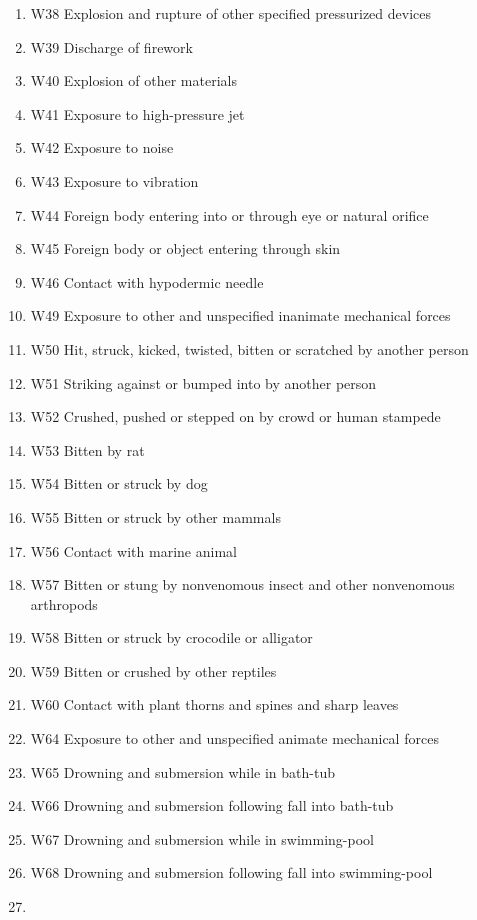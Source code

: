 \documentclass[
]{scrartcl}
\begin{document}
\begin{itemize}
\begin{enumerate}
  \item
    W38 Explosion and rupture of other specified pressurized devices
  \item
    W39 Discharge of firework
  \item
    W40 Explosion of other materials
  \item
    W41 Exposure to high-pressure jet
  \item
    W42 Exposure to noise
  \item
    W43 Exposure to vibration
  \item
    W44 Foreign body entering into or through eye or natural orifice
  \item
    W45 Foreign body or object entering through skin
  \item
    W46 Contact with hypodermic needle
  \item
    W49 Exposure to other and unspecified inanimate mechanical forces
  \item
    W50 Hit, struck, kicked, twisted, bitten or scratched by another
    person
  \item
    W51 Striking against or bumped into by another person
  \item
    W52 Crushed, pushed or stepped on by crowd or human stampede
  \item
    W53 Bitten by rat
  \item
    W54 Bitten or struck by dog
  \item
    W55 Bitten or struck by other mammals
  \item
    W56 Contact with marine animal
  \item
    W57 Bitten or stung by nonvenomous insect and other nonvenomous
    arthropods
  \item
    W58 Bitten or struck by crocodile or alligator
  \item
    W59 Bitten or crushed by other reptiles
  \item
    W60 Contact with plant thorns and spines and sharp leaves
  \item
    W64 Exposure to other and unspecified animate mechanical forces
  \item
    W65 Drowning and submersion while in bath-tub
  \item
    W66 Drowning and submersion following fall into bath-tub
  \item
    W67 Drowning and submersion while in swimming-pool
  \item
    W68 Drowning and submersion following fall into swimming-pool
  \item

\end{enumerate}
\end{itemize}
\end{document}
